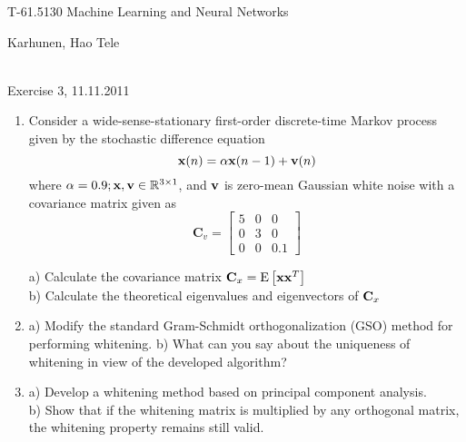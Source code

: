 \documentclass[10pt]{article}
\begin{document}
\pagestyle{empty}
\begin{Large}
\begin{bf} 
T-61.5130 Machine Learning and Neural Networks\\ 
\end{bf}
\end{Large}
Karhunen, Hao Tele\\  
\\
\begin{large}
\begin{bf}
Exercise 3,  11.11.2011
\end{bf}
\end{large}
\begin{enumerate}

\item Consider a wide-sense-stationary
  first-order discrete-time Markov process given by the stochastic
  difference equation
\[
{\bf x}(n) = \alpha {\bf x}(n-1) + {\bf v}(n)
\]
where $\alpha = 0.9; {\bf x}, {\bf v} \in \mathbb{R}^{3\times 1}$,
and ${\bf v}$ is zero-mean Gaussian white noise with a covariance
matrix given as
\begin{equation*}
\textbf{C}_v = \left[ \begin{array}{ccc}
5 & 0 & 0 \\
0 & 3 & 0 \\
0 & 0 & 0.1 \end{array} \right]
\end{equation*}

a) Calculate the covariance matrix ${\bf C}_x = \text{E}\left[ {\bf
    xx}^T \right]$\\
b) Calculate the theoretical eigenvalues and eigenvectors of ${\bf C}_x$

\vspace{2mm}

\item  a) Modify the standard Gram-Schmidt orthogonalization (GSO) method for
performing whitening. b) What can you say about the uniqueness of whitening in view of the
developed algorithm?


\vspace{2mm}

\item a) Develop a whitening method based on principal component analysis.\\
b) Show that if the whitening matrix is multiplied by any orthogonal
matrix, the whitening property remains still valid.


\vspace{2mm}


\end{enumerate}
\end{document}
